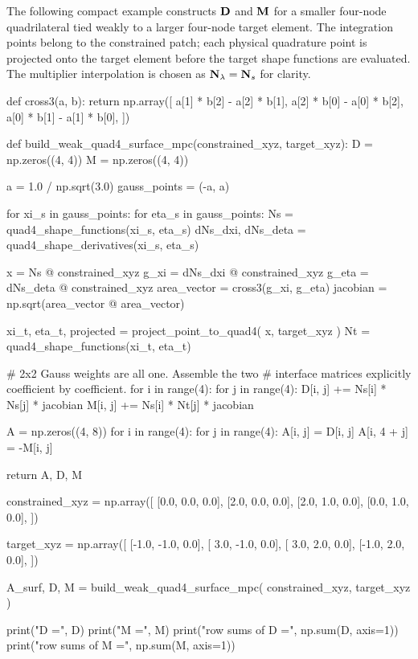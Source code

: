 The following compact example constructs $\mathbf{D}$ and $\mathbf{M}$ for a smaller
four-node quadrilateral tied weakly to a larger four-node target element. The
integration points belong to the constrained patch; each physical quadrature
point is projected onto the target element before the target shape functions are
evaluated. The multiplier interpolation is chosen as $\mathbf{N}_{\lambda}=\mathbf{N}_s$
for clarity.

\begin{python}
def cross3(a, b):
    return np.array([
        a[1] * b[2] - a[2] * b[1],
        a[2] * b[0] - a[0] * b[2],
        a[0] * b[1] - a[1] * b[0],
    ])


def build_weak_quad4_surface_mpc(constrained_xyz, target_xyz):
    D = np.zeros((4, 4))
    M = np.zeros((4, 4))

    a = 1.0 / np.sqrt(3.0)
    gauss_points = (-a, a)

    for xi_s in gauss_points:
        for eta_s in gauss_points:
            Ns = quad4_shape_functions(xi_s, eta_s)
            dNs_dxi, dNs_deta = quad4_shape_derivatives(xi_s, eta_s)

            x = Ns @ constrained_xyz
            g_xi = dNs_dxi @ constrained_xyz
            g_eta = dNs_deta @ constrained_xyz
            area_vector = cross3(g_xi, g_eta)
            jacobian = np.sqrt(area_vector @ area_vector)

            xi_t, eta_t, projected = project_point_to_quad4(
                x, target_xyz
            )
            Nt = quad4_shape_functions(xi_t, eta_t)

            # 2x2 Gauss weights are all one.  Assemble the two
            # interface matrices explicitly coefficient by coefficient.
            for i in range(4):
                for j in range(4):
                    D[i, j] += Ns[i] * Ns[j] * jacobian
                    M[i, j] += Ns[i] * Nt[j] * jacobian

    A = np.zeros((4, 8))
    for i in range(4):
        for j in range(4):
            A[i, j] = D[i, j]
            A[i, 4 + j] = -M[i, j]

    return A, D, M


constrained_xyz = np.array([
    [0.0, 0.0, 0.0],
    [2.0, 0.0, 0.0],
    [2.0, 1.0, 0.0],
    [0.0, 1.0, 0.0],
])

target_xyz = np.array([
    [-1.0, -1.0, 0.0],
    [ 3.0, -1.0, 0.0],
    [ 3.0,  2.0, 0.0],
    [-1.0,  2.0, 0.0],
])

A_surf, D, M = build_weak_quad4_surface_mpc(
    constrained_xyz, target_xyz
)

print("D =\n", D)
print("M =\n", M)
print("row sums of D =", np.sum(D, axis=1))
print("row sums of M =", np.sum(M, axis=1))
\end{python}

